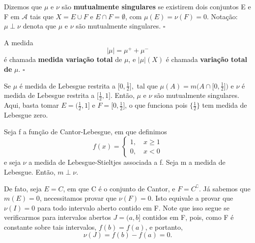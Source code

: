 \documentclass[measure_theory.tex]{subfiles}
\begin{document}
\begin{def*}
	Dizemos que \(\mu \) e \(\nu\) são \textbf{mutualmente singulares} se existirem dois conjuntos E e F em \(\mathcal{A}\) tais que \(X = E\cup F\) e \(E\cap F = \emptyset \), com \(\mu (E) = \nu(F) = 0.\) Notação: \(\mu \perp \nu\) denota que \(\mu \) e \(\nu\) são mutualmente singulares. \(\square\)
\end{def*}
\begin{def*}
	A medida
	\[
		|\mu | = \mu ^{+} + \mu ^{-}
	\]
	é chamada \textbf{medida variação total} de \(\mu \), e \(|\mu |(X)\) é chamada \textbf{variação total de }\(\mu \). \(\square\)
\end{def*}
\begin{example}
	Se \(\mu \) é medida de Lebesgue restrita a \(\biggl[0, \frac{1}{2}\biggr],\) tal que \(\mu (A) = m \biggl(A \cap \biggl[0, \frac{1}{2}\biggr]\biggr) \) e \(\nu\) é medida de Lebesgue restrita a \(\biggl[\frac{1}{2}, 1\biggr].\) Então, \(\mu \) e \(\nu\) são mutualmente singulares. Aqui, basta tomar \(E = \biggl(\frac{1}{2}, 1\biggr]\) e \(F = \biggl[0, \frac{1}{2}\biggr]\), o que funciona pois
	\(\biggl\{\frac{1}{2}\biggr\}\) tem medida de Lebesgue zero.
\end{example}
\begin{example}
	Seja f a função de Cantor-Lebesgue, em que definimos
	\[
		f(x) = \left\{\begin{array}{ll}
			1,\quad x\geq 1 \\
			0,\quad x < 0
		\end{array}\right.
	\]
	e seja \(\nu\) a medida de Lebesgue-Stieltjes associada a f. Seja m a medida de Lebesgue. Então, \(m\perp \nu\).

	De fato, seja \(E = C\), em que C é o conjunto de Cantor, e \(F= C ^{\complement}.\) Já sabemos que \(m(E) = 0\), necessitamos provar que
	\(\nu(F) = 0.\) Isto equivale a provar que \(\nu(I) = 0\) para todo intervalo aberto contido em F. Note que isso segue se verificarmos para intervalos abertos \(J = (a, b]\) contidos em F, pois, como
	F é constante sobre tais intervalos, \(f(b) = f(a)\), e portanto,
	\[
		\nu(J) = f(b)-f(a) = 0.
	\]
\end{example}
\end{document}
